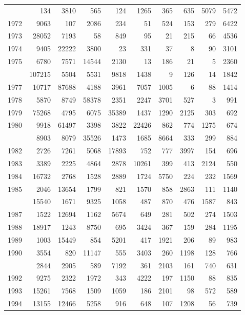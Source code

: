 \documentclass[
]{article}
\begin{document}
\begin{longtable}[t]{lrrrrrrrrr}
\addlinespace
1971 & 134 & 3810 & 565 & 124 & 1265 & 365 & 635 & 5079 & 5472\\
1972 & 9063 & 107 & 2086 & 234 & 51 & 524 & 153 & 279 & 6422\\
1973 & 28052 & 7193 & 58 & 849 & 95 & 21 & 215 & 66 & 4536\\
1974 & 9405 & 22222 & 3800 & 23 & 331 & 37 & 8 & 90 & 3101\\
1975 & 6780 & 7571 & 14544 & 2130 & 13 & 186 & 21 & 5 & 2360\\
\addlinespace
1976 & 107215 & 5504 & 5531 & 9818 & 1438 & 9 & 126 & 14 & 1842\\
1977 & 10717 & 87688 & 4188 & 3961 & 7057 & 1005 & 6 & 88 & 1414\\
1978 & 5870 & 8749 & 58378 & 2351 & 2247 & 3701 & 527 & 3 & 991\\
1979 & 75268 & 4795 & 6075 & 35389 & 1437 & 1290 & 2125 & 303 & 692\\
1980 & 9918 & 61497 & 3398 & 3822 & 22426 & 862 & 774 & 1275 & 674\\
\addlinespace
1981 & 8903 & 8079 & 35526 & 1473 & 1685 & 8664 & 333 & 299 & 884\\
1982 & 2726 & 7261 & 5068 & 17893 & 752 & 777 & 3997 & 154 & 696\\
1983 & 3389 & 2225 & 4864 & 2878 & 10261 & 399 & 413 & 2124 & 550\\
1984 & 16732 & 2768 & 1528 & 2889 & 1724 & 5750 & 224 & 232 & 1569\\
1985 & 2046 & 13654 & 1799 & 821 & 1570 & 858 & 2863 & 111 & 1140\\
\addlinespace
1986 & 15540 & 1671 & 9325 & 1058 & 487 & 870 & 476 & 1587 & 843\\
1987 & 1522 & 12694 & 1162 & 5674 & 649 & 281 & 502 & 274 & 1503\\
1988 & 18917 & 1243 & 8750 & 695 & 3424 & 367 & 159 & 284 & 1195\\
1989 & 1003 & 15449 & 854 & 5201 & 417 & 1921 & 206 & 89 & 983\\
1990 & 3554 & 820 & 11147 & 555 & 3403 & 260 & 1198 & 128 & 766\\
\addlinespace
1991 & 2844 & 2905 & 589 & 7192 & 361 & 2103 & 161 & 740 & 631\\
1992 & 9275 & 2322 & 1972 & 343 & 4222 & 197 & 1150 & 88 & 835\\
1993 & 15261 & 7568 & 1509 & 1059 & 186 & 2101 & 98 & 572 & 589\\
1994 & 13155 & 12466 & 5258 & 916 & 648 & 107 & 1208 & 56 & 739\\

\end{longtable}
\end{document}
